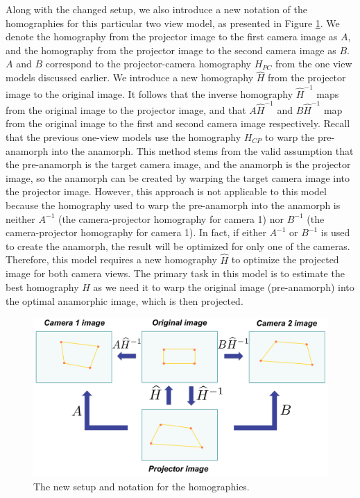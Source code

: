 \documentclass[11pt, oneside, reqno]{book}
\begin{document}
Along with the changed setup, we also introduce a new notation of the homographies for this particular two view model, as presented in Figure \ref{fig:2viewHDiagram}. We denote the homography from the projector image to the first camera image as $A$, and the homography from the projector image to the second camera image as $B$. $A$ and $B$ correspond to the projector-camera homography $H_{PC}$ from the one view models discussed earlier. 
We introduce a new homography $\widehat{H}$ from the projector image to the original image. It follows that the inverse homography $\widehat{H}^{-1}$ maps from the original image to the projector image, and that $A\widehat{H}^{-1}$ and $B\widehat{H}^{-1}$ map from the original image to the first and second camera image respectively. 
Recall that the previous one-view models use the homography $H_{CP}$ to warp the pre-anamorph into the anamorph. This method stems from the valid assumption that the pre-anamorph is the target camera image, and the anamorph is the projector image, so the anamorph can be created by warping the target camera image into the projector image. 
However, this approach is not applicable to this model because the homography used to warp the pre-anamorph into the anamorph is neither $A^{-1}$ (the camera-projector homography for camera 1) nor $B^{-1}$ (the camera-projector homography for camera 1). In fact, if either $A^{-1}$ or $B^{-1}$ is used to create the anamorph, the result will be optimized for only one of the cameras. 
Therefore, this model requires a new homography $\widehat{H}$ to optimize the projected image for both camera views. 
The primary task in this model is to estimate the best homography $\widehat{H}$ as we need it to warp the original image (pre-anamorph) into the optimal anamorphic image, which is then projected.

\begin{figure}[t]
	\centering
	\includegraphics[width=.7\linewidth]{data/2view/setup/2view_Hdiagram}
	\caption{The new setup and notation for the homographies.}
	\label{fig:2viewHDiagram}
\end{figure}
\end{document}

